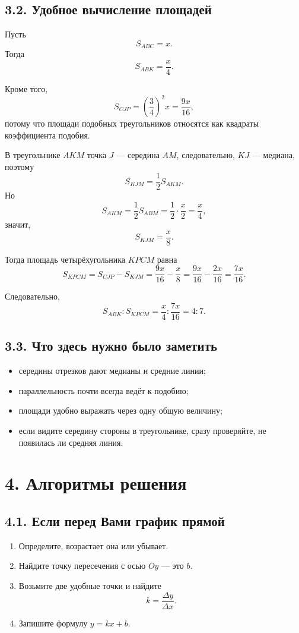 \documentclass[a4paper,12pt]{article}
\begin{document}
\subsection*{3.2. Удобное вычисление площадей}
Пусть
\[
S_{ABC}=x.
\]
Тогда
\[
S_{ABK}=\frac{x}{4}.
\]

Кроме того,
\[
S_{CJP}=\left(\frac34\right)^2 x=\frac{9x}{16},
\]
потому что площади подобных треугольников относятся как квадраты коэффициента подобия.

В треугольнике \(AKM\) точка \(J\) --- середина \(AM\), следовательно, \(KJ\) --- медиана, поэтому
\[
S_{KJM}=\frac12 S_{AKM}.
\]
Но
\[
S_{AKM}=\frac12 S_{ABM}=\frac12\cdot \frac{x}{2}=\frac{x}{4},
\]
значит,
\[
S_{KJM}=\frac{x}{8}.
\]

Тогда площадь четырёхугольника \(KPCM\) равна
\[
S_{KPCM}=S_{CJP}-S_{KJM}
=\frac{9x}{16}-\frac{x}{8}
=\frac{9x}{16}-\frac{2x}{16}
=\frac{7x}{16}.
\]

Следовательно,
\[
S_{ABK}:S_{KPCM}=\frac{x}{4}:\frac{7x}{16}=4:7.
\]

\subsection*{3.3. Что здесь нужно было заметить}
\begin{itemize}
  \item середины отрезков дают медианы и средние линии;
  \item параллельность почти всегда ведёт к подобию;
  \item площади удобно выражать через одну общую величину;
  \item если видите середину стороны в треугольнике, сразу проверяйте, не появилась ли средняя линия.
\end{itemize}

\section*{4. Алгоритмы решения}

\subsection*{4.1. Если перед Вами график прямой}
\begin{enumerate}
  \item Определите, возрастает она или убывает.
  \item Найдите точку пересечения с осью \(Oy\) --- это \(b\).
  \item Возьмите две удобные точки и найдите
  \[
  k=\frac{\Delta y}{\Delta x}.
  \]
  \item Запишите формулу \(y=kx+b\).
\end{enumerate}
\end{document}

